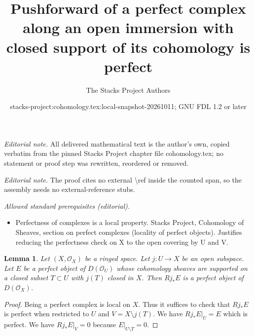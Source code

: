\documentclass[10pt,a4paper]{amsart}
\title{Pushforward of a perfect complex along an open immersion with closed support of its cohomology is perfect}
\author{The Stacks Project Authors}
\date{stacks-project:cohomology.tex:local-snapshot-20261011; GNU FDL 1.2 or later}
\theoremstyle{plain}
\newtheorem{lemma}[subsection]{Lemma}
\theoremstyle{definition}
\theoremstyle{remark}
\numberwithin{equation}{subsection}
\begin{document}
\maketitle
\noindent\textit{Editorial note.} All delivered mathematical text is the author's own, copied verbatim from the pinned Stacks Project chapter file cohomology.tex; no statement or proof step was rewritten, reordered or removed.\par\medskip
\noindent\textit{Editorial note.} The proof cites no external \textbackslash{}ref inside the counted span, so the assembly needs no external-reference stubs.\par\medskip
\noindent\textit{Allowed standard prerequisites (editorial).}\begin{itemize}
\item Perfectness of complexes is a local property. Stacks Project, Cohomology of Sheaves, section on perfect complexes (locality of perfect objects). Justifies reducing the perfectness check on X to the open covering by U and V.
\end{itemize}\medskip
\begin{lemma}
\label{lemma-pushforward-perfect}
Let $(X, \mathcal{O}_X)$ be a ringed space. Let $j : U \to X$ be an
open subspace. Let $E$ be a perfect object of $D(\mathcal{O}_U)$
whose cohomology
sheaves are supported on a closed subset $T \subset U$ with $j(T)$
closed in $X$. Then $Rj_*E$ is a perfect object of $D(\mathcal{O}_X)$.
\end{lemma}

\begin{proof}
Being a perfect complex is local on $X$. Thus it suffices to check that
$Rj_*E$ is perfect when restricted to $U$ and $V = X \setminus j(T)$.
We have $Rj_*E|_U = E$ which is perfect. We have
 $Rj_*E|_V = 0$ because $E|_{U \setminus T} = 0$.
\end{proof}
\end{document}
